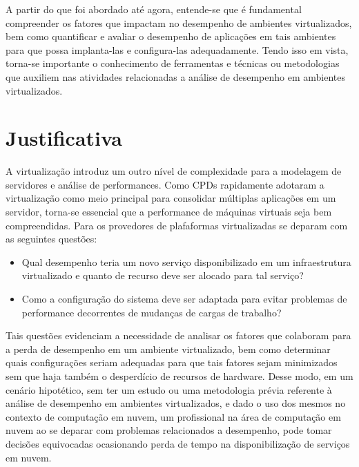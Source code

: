 A partir do que foi abordado até agora, entende-se que é fundamental compreender os fatores que impactam no desempenho de ambientes virtualizados, bem como quantificar e avaliar o desempenho de aplicações em tais ambientes para que possa implanta-las e configura-las adequadamente. Tendo isso em vista, torna-se importante o conhecimento de ferramentas e técnicas ou metodologias que auxiliem nas atividades relacionadas a análise de desempenho em ambientes virtualizados. 



\section{Justificativa}
A virtualização introduz um outro nível de complexidade para a modelagem de servidores e análise de performances. Como CPDs rapidamente adotaram a virtualização como meio principal para consolidar múltiplas aplicações em um servidor, torna-se essencial que a performance de máquinas virtuais seja bem compreendidas\cite{ticko2010}. Para  os provedores de plafaformas virtualizadas se deparam com as seguintes questões:

\begin{itemize}
  \item Qual desempenho teria um novo serviço disponibilizado em um infraestrutura virtualizado e quanto de recurso deve ser alocado para tal serviço?

  \item Como a configuração do sistema deve ser adaptada para evitar problemas de performance decorrentes de mudanças de cargas de trabalho?
\end{itemize}


Tais questões evidenciam a necessidade de analisar os fatores que colaboram para a perda de desempenho em um ambiente virtualizado, bem como determinar quais configurações seriam adequadas para que tais fatores sejam minimizados sem que haja também o desperdício de recursos de hardware. Desse modo, em um cenário hipotético, sem ter um estudo ou uma metodologia prévia referente à análise de desempenho em ambientes virtualizados, e dado o uso dos mesmos no contexto de computação em nuvem, um profissional na área de computação em nuvem ao se deparar com problemas relacionados a desempenho, pode tomar decisões equivocadas ocasionando perda de tempo na disponibilização de serviços em nuvem.



